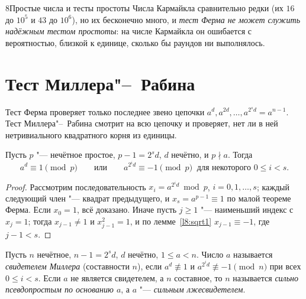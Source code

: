 \begin{lecture}{8}{Простые числа и тесты простоты}
Числа Кармайкла сравнительно редки (их $16$ до $10^5$ и $43$ до $10^6$), но их бесконечно
много, и \emph{тест Ферма не может служить надёжным тестом простоты}: на числе Кармайкла
он ошибается с вероятностью, близкой к единице, сколько бы раундов ни выполнялось.




\section{Тест Миллера"--~Рабина}

Тест Ферма проверяет только последнее звено цепочки
$a^d, a^{2d}, \ldots, a^{2^s d} = a^{n-1}$. Тест Миллера"--~Рабина смотрит на всю цепочку
и проверяет, нет ли в ней нетривиального квадратного корня из единицы.

\begin{theorem}\label{l8:mr-prime}
Пусть $p$ "--- нечётное простое, $p - 1 = 2^s d$, $d$ нечётно, и $p \nmid a$. Тогда
\[
  a^d \equiv 1 \pmod p \qquad\text{или}\qquad a^{2^i d} \equiv -1 \pmod p
  \ \text{ для некоторого } 0 \le i < s.
\]
\end{theorem}

\begin{proof}
Рассмотрим последовательность $x_i = a^{2^i d} \bmod p$, $i = 0, 1, \ldots, s$; каждый
следующий член "--- квадрат предыдущего, и $x_s = a^{p-1} \equiv 1$ по малой теореме Ферма.
Если $x_0 = 1$, всё доказано. Иначе пусть $j \ge 1$ "--- наименьший индекс с $x_j = 1$; тогда
$x_{j-1} \ne 1$ и $x_{j-1}^2 = 1$, и по лемме~\ref{l8:sqrt1} $x_{j-1} \equiv -1$, где
$j - 1 < s$.
\end{proof}

\begin{definition}
Пусть $n$ нечётное, $n - 1 = 2^s d$, $d$ нечётно, $1 \le a < n$. Число $a$ называется
\emph{свидетелем Миллера} (составности $n$), если $a^d \not\equiv 1$ и
$a^{2^i d} \not\equiv -1 \pmod n$ при всех $0 \le i < s$. Если $a$ не является свидетелем,
а $n$ составное, то $n$ называется \emph{сильно псевдопростым по основанию $a$}, а $a$ "---
\emph{сильным лжесвидетелем}.
\end{definition}


\end{lecture}
